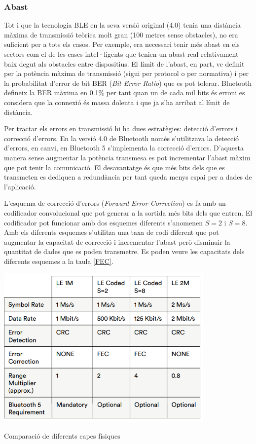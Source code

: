 \subsubsection{Abast}
Tot i que la tecnologia BLE en la seva versió original (4.0) tenia una distància màxima de transmissió teòrica molt gran (100 metres sense obstacles), no era suficient per a tots els casos.
Per exemple, era necessari tenir més abast en els sectors com el de les cases intel·ligents que tenien un abast real relativament baix degut als obstacles entre dispositius.
El límit de l'abast, en part, ve definit per la potència màxima de transmissió (sigui per protocol o per normativa) i per la probabilitat d'error de bit BER (\textit{Bit Error Ratio}) que es pot tolerar.
Bluetooth defineix la BER màxima en 0.1\% per tant quan un de cada mil bits és erroni es considera que la connexió és massa dolenta i que ja s'ha arribat al límit de distància.

Per tractar els errors en transmissió hi ha dues estratègies: detecció d'errors i correcció d'errors.
En la versió 4.0 de Bluetooth només s'utilitzava la detecció d'errors, en canvi, en Bluetooth 5 s'implementa la correcció d'errors.
D'aquesta manera sense augmentar la potència transmesa es pot incrementar l'abast màxim que pot tenir la comunicació.
El desavantatge és que més bits dels que es transmeten es dediquen a redundància per tant queda menys espai per a dades de l'aplicació.


L'esquema de correcció d'errors (\textit{Forward Error Correction}) es fa amb un codificador convolucional que pot generar a la sortida més bits dels que entren. El codificador pot funcionar amb dos esquemes diferents s'anomenen $S=2$ i $S=8$.
Amb els diferents esquemes s'utilitza una taxa de codi diferent que pot augmentar la capacitat de correcció i incrementar l'abast però disminuir la quantitat de dades que es poden transmetre.
Es poden veure les capacitats dels diferents esquemes a la taula \ref{FEC}.

\begin{table}[htb]
	\begin{center}
		\includegraphics[width=0.8\textwidth]{./images/LE_PHY_edited.png}
		\caption{Comparació de diferents capes físiques \cite{BLE_5_improvement_over_4}}
		\label{FEC}
	\end{center}
\end{table}


